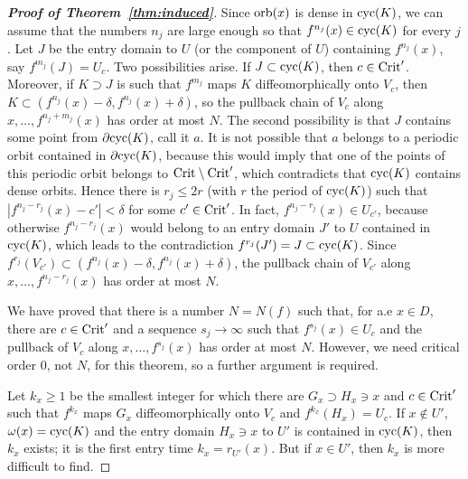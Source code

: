 \documentclass[12pt, psamsfonts, reqno]{amsart}
\begin{document}
\begin{proof}[\textbf{Proof of Theorem~\ref{thm:induced}}]
Since ${\mathop{\rm orb}\nolimits}(x)$ is dense in ${\mathop{\rm cyc}\nolimits}(K)$, we can assume that the
numbers $n_j$ are large enough so that $f^{n_j}(x)\in {\mathop{\rm cyc}\nolimits}(K)$ for
every $j$. Let $J$ be the entry domain to $U$ (or the component of
$U$) containing $f^{n_j}(x)$, say $f^{m_j}(J)=U_c$. Two
possibilities arise. If $J\subset {\mathop{\rm cyc}\nolimits}(K)$, then $c\in {\mathop{\rm Crit}\nolimits}'$.
Moreover, if $K\supset J$ is such that $f^{m_j}$ maps $K$
diffeomorphically onto $V_c$, then $K\subset
(f^{n_j}(x)-\delta,f^{n_j}(x)+\delta)$, so the pullback chain of
$V_c$ along $x,\ldots, f^{n_j+m_j}(x)$ has order at most $N$. The
second possibility is that $J$ contains some point from $\partial
{\mathop{\rm cyc}\nolimits}(K)$, call it $a$. It is not possible that $a$ belongs to a
periodic orbit contained in $\partial {\mathop{\rm cyc}\nolimits}(K)$, because this would
imply that one of the points of this periodic orbit belongs to
${\mathop{\rm Crit}\nolimits}\setminus {\mathop{\rm Crit}\nolimits}'$, which contradicts that ${\mathop{\rm cyc}\nolimits}(K)$ contains
dense orbits. Hence there is $r_j\leq 2r$ (with $r$ the period of
${\mathop{\rm cyc}\nolimits}(K)$) such that $|f^{n_j-r_j}(x)-c'|<\delta$ for some $c'\in
{\mathop{\rm Crit}\nolimits}'$. In fact, $f^{n_j-r_j}(x)\in U_{c'}$, because otherwise
$f^{n_j-r_j}(x)$ would belong to an entry domain $J'$ to $U$
contained in ${\mathop{\rm cyc}\nolimits}(K)$, which leads to the contradiction
$f^{r_j}(J')=J\subset {\mathop{\rm cyc}\nolimits}(K)$. Since $f^{r_j}(V_{c'})\subset
(f^{n_j}(x)-\delta,f^{n_j}(x)+\delta)$, the pullback chain of
$V_{c'}$ along $x,\ldots, f^{n_j-r_j}(x)$ has order at most $N$.

We have proved that there is a number $N=N(f)$ such that, for a.e
$x\in D$, there are $c\in {\mathop{\rm Crit}\nolimits}'$ and a sequence $s_j\to \infty$
such that $f^{s_j}(x)\in U_c$ and the pullback of $V_c$ along
$x,\ldots, f^{s_j}(x)$ has order at most $N$. However, we need
critical order $0$, not $N$, for this theorem, so a further
argument is required.

Let $k_x \geq 1$ be the smallest integer for which there are $G_x
\supset H_x \owns x$ and $c \in {\mathop{\rm Crit}\nolimits}'$ such that $f^{k_x}$ maps
$G_x$ diffeomorphically onto $V_c$ and $f^{k_x}(H_x) = U_c$. If
$x\notin U'$, $\omega(x)={\mathop{\rm cyc}\nolimits}(K)$ and the entry domain $H_x\owns
x$ to $U'$ is contained in ${\mathop{\rm cyc}\nolimits}(K)$, then $k_x$ exists; it is the
first entry time $k_x = r_{U'}(x)$. But if $x\in U'$, then $k_x$
is more difficult to find.


\end{proof}
\end{document}

